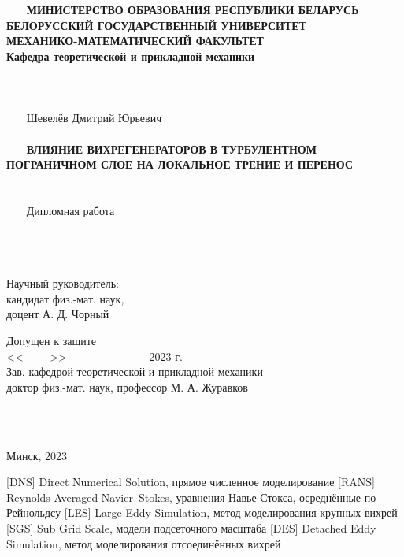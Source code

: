 \def\figurename{Рисунок}
\begin{titlepage}
	\begin{center}
		~~~
		\\
		~~~
		\\
		~~~
		\textbf{МИНИСТЕРСТВО ОБРАЗОВАНИЯ РЕСПУБЛИКИ БЕЛАРУСЬ\\
			БЕЛОРУССКИЙ ГОСУДАРСТВЕННЫЙ УНИВЕРСИТЕТ\\
			МЕХАНИКО-МАТЕМАТИЧЕСКИЙ ФАКУЛЬТЕТ\\
			Кафедра теоретической и прикладной механики\\}
		~~~
		\\
		~~~
		\\
		~~~
		\\
		~~~
		Шевелёв Дмитрий Юрьевич\\
		~~~
		\\
		~~~
		\textbf{ВЛИЯНИЕ ВИХРЕГЕНЕРАТОРОВ В ТУРБУЛЕНТНОМ ПОГРАНИЧНОМ СЛОЕ НА ЛОКАЛЬНОЕ ТРЕНИЕ И ПЕРЕНОС\\}
		~~~
		\\
		~~~
		\\
		~~~
		Дипломная работа\\
		~~~
		\\
		~~~
		\\
		~~~
	\end{center}
	\begin{flushright}
		Научный руководитель:\\
		кандидат физ.-мат. наук,\\
		доцент А. Д. Чорный\\
	\end{flushright}
	\begin{flushleft}
		Допущен к защите\\
		<<$\underline{\hspace{1cm}}$>>$\underline{\hspace{3cm}}$ 2023 г.\\
		Зав. кафедрой теоретической и прикладной механики\\
		доктор физ.-мат. наук, профессор М. А. Журавков
	\end{flushleft}
	~~~
	\\
	~~~
	\begin{center}
		Минск, 2023
	\end{center}
\end{titlepage}
\tableofcontents
\newpage
{}
\begin{acronym}[RANS]
	  [DNS]   {Direct Numerical Solution, прямое численное моделирование}
	 [RANS]  {Reynolds-Averaged Navier–Stokes, уравнения Навье-Стокса, осреднённые по Рейнольдсу}
	  [LES]   {Large Eddy Simulation, метод моделирования крупных вихрей}
	  [SGS]   {Sub Grid Scale, модели подсеточного масштаба}
	  [DES]   {Detached Eddy Simulation, метод моделирования отсоединённых вихрей}
\end{acronym}
\newpage
{}
	
